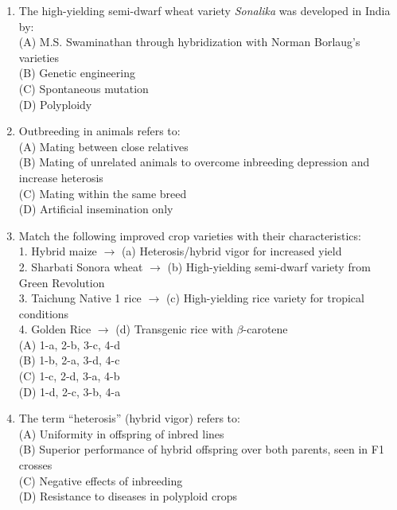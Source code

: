 \documentclass{article}
\begin{document}
\begin{enumerate}[label=Q\arabic*.]
\item The high-yielding semi-dwarf wheat variety \textit{Sonalika} was developed in India by:
\\(A) M.S. Swaminathan through hybridization with Norman Borlaug's varieties
\\(B) Genetic engineering
\\(C) Spontaneous mutation
\\(D) Polyploidy

\item Outbreeding in animals refers to:
\\(A) Mating between close relatives
\\(B) Mating of unrelated animals to overcome inbreeding depression and increase heterosis
\\(C) Mating within the same breed
\\(D) Artificial insemination only

\item Match the following improved crop varieties with their characteristics:\\
1. Hybrid maize $\rightarrow$ (a) Heterosis/hybrid vigor for increased yield\\
2. Sharbati Sonora wheat $\rightarrow$ (b) High-yielding semi-dwarf variety from Green Revolution\\
3. Taichung Native 1 rice $\rightarrow$ (c) High-yielding rice variety for tropical conditions\\
4. Golden Rice $\rightarrow$ (d) Transgenic rice with $\beta$-carotene
\\(A) 1-a, 2-b, 3-c, 4-d
\\(B) 1-b, 2-a, 3-d, 4-c
\\(C) 1-c, 2-d, 3-a, 4-b
\\(D) 1-d, 2-c, 3-b, 4-a

\item The term ``heterosis'' (hybrid vigor) refers to:
\\(A) Uniformity in offspring of inbred lines
\\(B) Superior performance of hybrid offspring over both parents, seen in F1 crosses
\\(C) Negative effects of inbreeding
\\(D) Resistance to diseases in polyploid crops

\end{enumerate}
\end{document}
